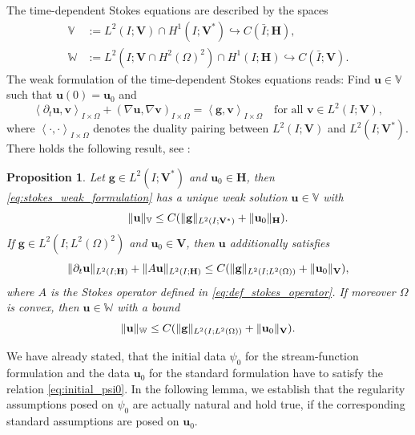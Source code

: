 \documentclass{m2an}
\newcommand{\1}{\mathds{1}}
\newcommand{\uu}{\mathbf{u}}
\newcommand{\vv}{\mathbf{v}}
\newcommand{\g}{\mathbf{g}}
\newcommand{\Om}{\Omega}
\newcommand{\IOprod}[1]{\left( #1 \right)_{I\times \Omega}}
\newcommand{\IOpair}[1]{\left\langle #1 \right\rangle_{I\times \Omega}}
\renewcommand{\textforall}{\text{for all }}
\DeclarePairedDelimiter{\norm}{\lVert}{\rVert}
\newcommand{\V}{\mathbf{V}}
\renewcommand{\H}{\mathbf{H}}
\newcommand{\VV}{\mathbb{V}}
\newcommand{\WW}{\mathbb{W}}
\newtheorem{proposition}[theorem]{Proposition}
\theoremstyle{definition}
\begin{document}
    The time-dependent Stokes equations are described by the spaces
    \begin{align*}
        \VV & := L^2(I;\V) \cap H^1(I;\V^*) \hookrightarrow C(\bar I;\H),\\
        \WW & := L^2(I;\V \cap H^2(\Om)^2) \cap H^1(I;\H) \hookrightarrow C(\bar I;\V).
    \end{align*}
    The weak formulation of the time-dependent Stokes equations reads:
    Find $\uu \in \VV$ such that $\uu(0) = \uu_0$ and
    \begin{equation}\label{eq:stokes_weak_formulation}
        \IOpair{\partial_t \uu,\vv} + \IOprod{\nabla \uu,\nabla \vv} 
        = \IOpair{\g,\vv} \quad \textforall \vv \in L^2(I;\V),
    \end{equation}
    where $\IOpair{\cdot,\cdot}$ denotes the duality pairing between $L^2(I;\V)$ and $L^2(I;\V^*)$.
    There holds the following result, see 
    \cite[Chapter III, Theorem 1.1 Proposition 1.2]{temam_navier_stokes_2001}:
    \begin{proposition}
        Let $\g \in L^2(I;\V^*)$ and $\uu_0 \in \H$, then \eqref{eq:stokes_weak_formulation}
        has a unique weak solution $\uu \in \VV$ with
        \begin{equation*}
            \norm{\uu}_{\VV} \le C(\norm{\g}_{L^2(I;\V^*)} + \norm{\uu_0}_{\H}).
        \end{equation*}
        If $\g \in L^2(I;L^2(\Om)^2)$ and $\uu_0 \in \V$, then $\uu$ additionally satisfies
        \begin{equation*}
            \norm{\partial_t \uu}_{L^2(I;\H)} + \norm{A \uu}_{L^2(I;\H)} \le
            C(\norm{\g}_{L^2(I;L^2(\Om))} + \norm{\uu_0}_{\V}),
        \end{equation*}
        where $A$ is the Stokes operator defined in \eqref{eq:def_stokes_operator}.
        If moreover $\Omega$ is convex, then $\uu \in \WW$ with a bound
        \begin{equation*}
            \norm{\uu}_{\WW} \le C (\norm{\g}_{L^2(I;L^2(\Om))} + \norm{\uu_0}_{\V}).
        \end{equation*}
    \end{proposition}
    We have already stated, that the initial data $\psi_0$ for the stream-function formulation and 
    the data $\uu_0$ for the standard formulation have to satisfy the relation \eqref{eq:initial_psi0}.
    In the following lemma, we establish that the regularity assumptions posed on $\psi_0$ are actually natural
    and hold true, if the corresponding standard assumptions are posed on $\uu_0$.
\end{document}
